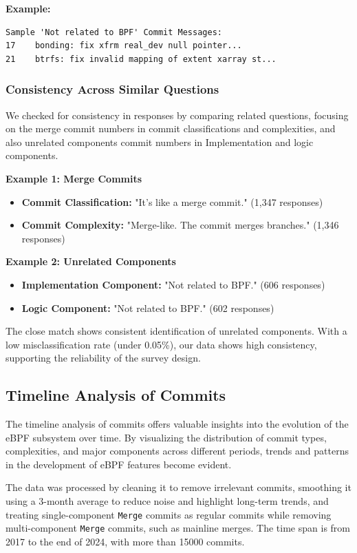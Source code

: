 \textbf{Example:}
\begin{verbatim}
Sample 'Not related to BPF' Commit Messages:
17    bonding: fix xfrm real_dev null pointer...
21    btrfs: fix invalid mapping of extent xarray st...
\end{verbatim}

\subsubsection{Consistency Across Similar Questions}

We checked for consistency in responses by comparing related questions, focusing on the merge commit numbers in commit classifications and complexities, and also unrelated components commit numbers in Implementation and logic components.

\textbf{Example 1: Merge Commits}
\begin{itemize}
    \item \textbf{Commit Classification:} "It's like a merge commit." (1,347 responses)
    \item \textbf{Commit Complexity:} "Merge-like. The commit merges branches." (1,346 responses)
\end{itemize}

\textbf{Example 2: Unrelated Components}
\begin{itemize}
    \item \textbf{Implementation Component:} "Not related to BPF." (606 responses)
    \item \textbf{Logic Component:} "Not related to BPF." (602 responses)
\end{itemize}

The close match shows consistent identification of unrelated components. With a low misclassification rate (under 0.05\%), our data shows high consistency, supporting the reliability of the survey design.

\subsection{Timeline Analysis of Commits}

The timeline analysis of commits offers valuable insights into the evolution of the eBPF subsystem over time. By visualizing the distribution of commit types, complexities, and major components across different periods, trends and patterns in the development of eBPF features become evident.

The data was processed by cleaning it to remove irrelevant commits, smoothing it using a 3-month average to reduce noise and highlight long-term trends, and treating single-component \texttt{Merge} commits as regular commits while removing multi-component \texttt{Merge} commits, such as mainline merges. The time span is from 2017 to the end of 2024, with more than 15000 commits.

